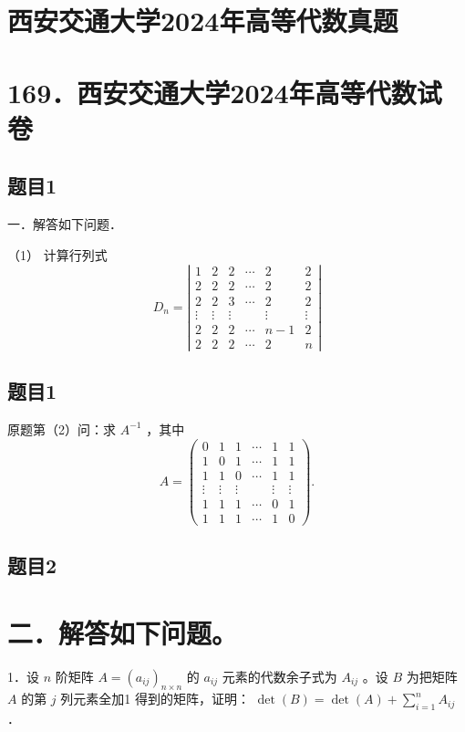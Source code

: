 \documentclass{article}
\begin{document}
\section*{西安交通大学2024年高等代数真题}
\section*{169．西安交通大学2024年高等代数试卷}

\subsection{题目1}
一．解答如下问题．

（1） 计算行列式
\[
D_{n}=\left|\begin{array}{cccccc}
1 & 2 & 2 & \cdots & 2 & 2 \\
2 & 2 & 2 & \cdots & 2 & 2 \\
2 & 2 & 3 & \cdots & 2 & 2 \\
\vdots & \vdots & \vdots & & \vdots & \vdots \\
2 & 2 & 2 & \cdots & n-1 & 2 \\
2 & 2 & 2 & \cdots & 2 & n
\end{array}\right|
\]

\subsection{题目1}
原题第（2）问：求 \(A^{-1}\) ，其中
\[
A=\left(\begin{array}{cccccc}
0 & 1 & 1 & \cdots & 1 & 1 \\
1 & 0 & 1 & \cdots & 1 & 1 \\
1 & 1 & 0 & \cdots & 1 & 1 \\
\vdots & \vdots & \vdots & & \vdots & \vdots \\
1 & 1 & 1 & \cdots & 0 & 1 \\
1 & 1 & 1 & \cdots & 1 & 0
\end{array}\right) .
\]

\subsection{题目2}
\section*{二．解答如下问题。}

1．设 \(n\) 阶矩阵 \(A=\left(a_{i j}\right)_{n \times n}\) 的 \(a_{i j}\) 元素的代数余子式为 \(A_{i j}\) 。设 \(B\) 为把矩阵 \(A\) 的第 \(j\) 列元素全加1 得到的矩阵，证明： \(\operatorname{det}(B)=\operatorname{det}(A)+\sum_{i=1}^{n} A_{i j}\) ．
\end{document}
